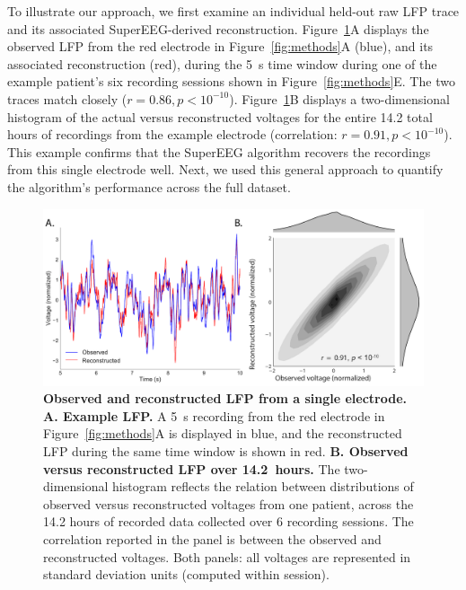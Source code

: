 \documentclass[11pt]{article}
\begin{document}
To illustrate our approach, we first examine an individual held-out
raw LFP trace and its associated SuperEEG-derived reconstruction.
Figure~\ref{fig:recon}A displays the observed LFP from the red
electrode in Figure~\ref{fig:methods}A (blue), and its associated
reconstruction (red), during the 5~s time window during one of the
example patient's six recording sessions shown in
Figure~\ref{fig:methods}E.  The two traces match closely
($r = 0.86, p < 10^{-10}$).  Figure~\ref{fig:recon}B displays a
two-dimensional histogram of the actual versus reconstructed voltages
for the entire 14.2 total hours of recordings from the example
electrode (correlation: $r = 0.91, p < 10^{-10}$).  This example
confirms that the SuperEEG algorithm recovers the recordings from this
single electrode well.  Next, we used this general approach to
quantify the algorithm's performance across the full dataset.

\begin{figure}
  \centering
  \includegraphics[width=\textwidth]{figs/recon}
  \caption{\textbf{Observed and reconstructed LFP from a single
      electrode.} \textbf{A. Example LFP.}  A 5~s recording from the
    red electrode in Figure~\ref{fig:methods}A is displayed in blue,
    and the reconstructed LFP during the same time window is shown in
    red.  \textbf{B. Observed versus reconstructed LFP over
      14.2~hours.}  The two-dimensional histogram reflects the
    relation between distributions of observed versus reconstructed
    voltages from one patient, across the 14.2 hours of recorded data
    collected over 6 recording sessions.  The correlation reported in
    the panel is between the observed and reconstructed voltages.
    Both panels: all voltages are represented in standard deviation units
   (computed within session).}
  \label{fig:recon}
\end{figure}
\end{document}
